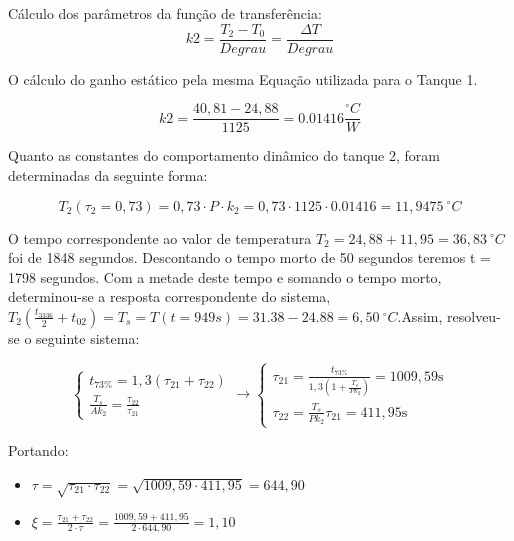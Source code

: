 Cálculo dos parâmetros da função de transferência:
\begin{equation}\label{key}
k 2=\frac{T_{2}-T_{0}}{D e g r a u}=\frac{\Delta T}{D e g r a u}
\end{equation}

O cálculo do ganho estático pela mesma Equação utilizada para o Tanque 1.

\begin{equation}\label{key}
k 2=\frac{40,81-24,88}{1125}=0.01416 \frac{^{\circ} C}{W}
\end{equation}

Quanto as constantes do comportamento dinâmico do tanque 2, foram determinadas da seguinte forma:

\begin{equation}\label{key}
T_{2}\left(\tau_{2}=0,73\right)=0,73 \cdot P \cdot k_{2}=0,73 \cdot 1125 \cdot 0.01416=11,9475 \ ^{\circ} C
\end{equation}

O tempo correspondente ao valor de temperatura $ T_2= 24,88 + 11,95 = 36,83 \ ^{\circ}C  $ foi de 1848 segundos. Descontando o tempo morto de 50 segundos teremos t = 1798 segundos. Com a metade deste tempo e somando o tempo morto, determinou-se a resposta correspondente do sistema,$ T_{2}\left(\frac{t_{3336}}{2}+t_{02}\right)=T_{s}=T(t=949 s)=31.38-24.88=6,50 \ ^{\circ} C . $Assim, resolveu-se o seguinte sistema:


\begin{equation}\label{key}
\left\{\begin{array}{c}{t_{73\%}=1,3\left(\tau_{21}+\tau_{22}\right)} \\ {\frac{T_{s}}{A k_{2}}=\frac{\tau_{22}}{\tau_{21}}}\end{array}\right. \rightarrow \left\{\begin{array}{c}{\tau_{21}=\frac{t_{73 \%}}{1,3\left(1+\frac{T_{s}}{P k_{2}}\right)}=1009,59 \mathrm{s}} \\ {\tau_{22}=\frac{T_{s}}{P k_{2}} \tau_{21}=411,95 \mathrm{s}}\end{array}\right.
\end{equation}

Portando:

\begin{itemize}
\item $ \tau=\sqrt{\tau_{21} \cdot \tau_{22}}=\sqrt{1009,59 \cdot 411,95}=644,90 $
\item $ \xi=\frac{\tau_{21}+\tau_{22}}{2 \cdot \tau}=\frac{1009,59+411,95}{2 \cdot 644,90}=1,10 $
\end{itemize}


